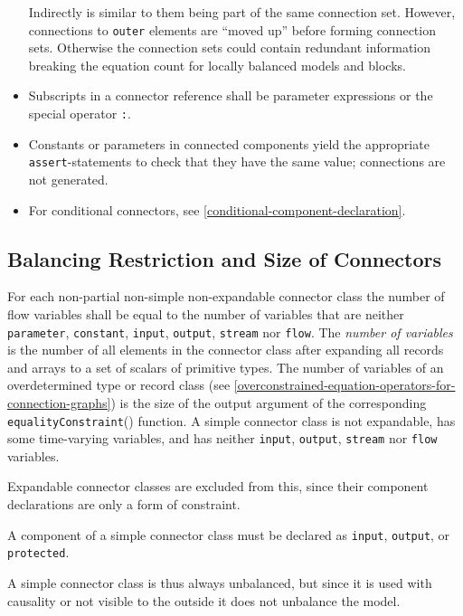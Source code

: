 \begin{itemize}
  \begin{nonnormative}
  Indirectly is similar to them being part of the same connection set.
  However, connections to \lstinline!outer! elements are ``moved up'' before forming connection sets.
  Otherwise the connection sets could contain redundant information breaking the equation count for locally balanced models and blocks.
  \end{nonnormative}
\item
  Subscripts in a connector reference shall be parameter expressions or the special operator \lstinline!:!.
\item
  Constants or parameters in connected components yield the appropriate \lstinline!assert!-statements to check that they have the same value; connections are not generated.
\item
  For conditional connectors, see \cref{conditional-component-declaration}.
\end{itemize}

\subsection{Balancing Restriction and Size of Connectors}\label{balancing-restriction-and-size-of-connectors}

For each non-partial non-simple non-expandable connector class the number of flow variables shall be equal to the number of variables that are neither \lstinline!parameter!, \lstinline!constant!, \lstinline!input!, \lstinline!output!, \lstinline!stream! nor \lstinline!flow!.
The \emph{number of variables} is the number of all elements in the connector class after expanding all records and arrays to a set of scalars of primitive types.
The number of variables of an overdetermined type or record class (see \cref{overconstrained-equation-operators-for-connection-graphs}) is the size of the output argument of the corresponding \lstinline!equalityConstraint!() function.
A simple connector class is not expandable, has some time-varying variables, and has neither \lstinline!input!, \lstinline!output!, \lstinline!stream! nor \lstinline!flow! variables.
\begin{nonnormative}
Expandable connector classes are excluded from this, since their component declarations are only a form of constraint.
\end{nonnormative}
A component of a simple connector class must be declared as \lstinline!input!, \lstinline!output!, or \lstinline!protected!.
\begin{nonnormative}
A simple connector class is thus always unbalanced, but since it is used with causality or not visible to the outside it does not unbalance the model.
\end{nonnormative}

